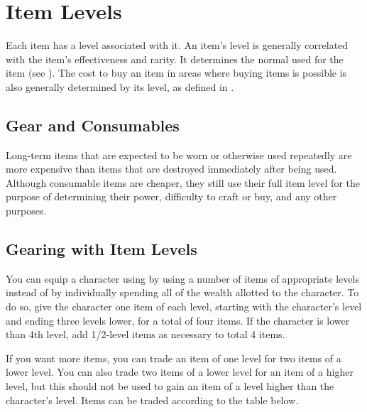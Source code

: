 \section{Item Levels}\label{Item Levels}

    Each item has a level associated with it.
    An item's level is generally correlated with the item's effectiveness and rarity.
    It determines the normal  used for the item (see ).
    The cost to buy an item in areas where buying items is possible is also generally determined by its level, as defined in .

    \subsection{Gear and Consumables}
        Long-term items that are expected to be worn or otherwise used repeatedly are more expensive than items that are destroyed immediately after being used.
        Although consumable items are cheaper, they still use their full item level for the purpose of determining their power, difficulty to craft or buy, and any other purposes.

    \subsection{Gearing with Item Levels}

        You can equip a character using by using a number of items of appropriate levels instead of by individually spending all of the wealth allotted to the character. To do so, give the character one item of each level, starting with the character's level and ending three levels lower, for a total of four items. If the character is lower than 4th level, add 1/2-level items as necessary to total 4 items.

        If you want more items, you can trade an item of one level for two items of a lower level.
        You can also trade two items of a lower level for an item of a higher level, but this should not be used to gain an item of a level higher than the character's level.
        Items can be traded according to the table below.


